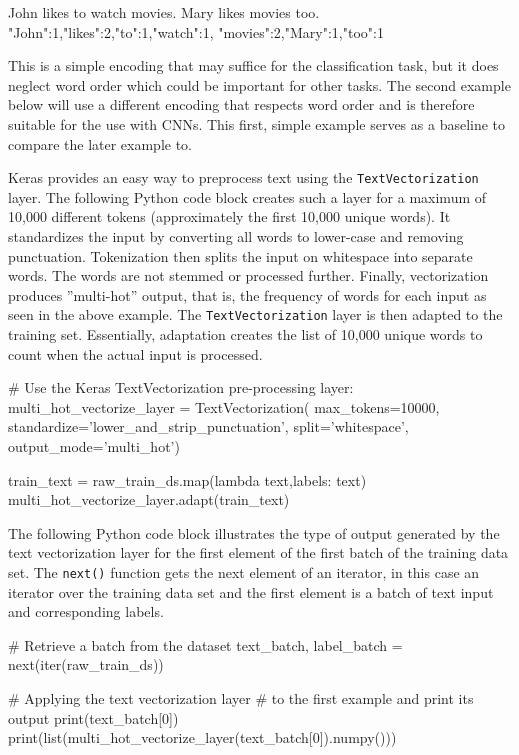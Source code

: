 \begin{textcode}
John likes to watch movies. Mary likes movies too.
{"John":1,"likes":2,"to":1,"watch":1, "movies":2,"Mary":1,"too":1}
\end{textcode}

This is a simple encoding that may suffice for the classification task, but it does neglect word order which could be important for other tasks. The second example below will use a different encoding that respects word order and is therefore suitable for the use with CNNs. This first, simple example serves as a baseline to compare the later example to.

Keras provides an easy way to preprocess text using the \texttt{TextVectorization} layer. The following Python code block creates such a layer for a maximum of 10,000 different tokens (approximately the first 10,000 unique words). It standardizes the input by converting all words to lower-case and removing punctuation. Tokenization then splits the input on whitespace into separate words. The words are not stemmed or processed further. Finally, vectorization produces ''multi-hot'' output, that is, the frequency of words for each input as seen in the above example. The \texttt{TextVectorization} layer is then adapted to the training set. Essentially, adaptation creates the list of 10,000 unique words to count when the actual input is processed.

\begin{pythoncode}
# Use the Keras TextVectorization pre-processing layer:
multi_hot_vectorize_layer = TextVectorization(
    max_tokens=10000,
    standardize='lower_and_strip_punctuation',
    split='whitespace',
    output_mode='multi_hot')
    
train_text = raw_train_ds.map(lambda text,labels: text)
multi_hot_vectorize_layer.adapt(train_text)
\end{pythoncode}

The following Python code block illustrates the type of output generated by the text vectorization layer for the first element of the first batch of the training data set. The \texttt{next()} function gets the next element of an iterator, in this case an iterator over the training data set and the first element is a batch of text input and corresponding labels.

\begin{pythoncode}
# Retrieve a batch from the dataset
text_batch, label_batch = next(iter(raw_train_ds))

# Applying the text vectorization layer
# to the first example and print its output
print(text_batch[0])
print(list(multi_hot_vectorize_layer(text_batch[0]).numpy()))
\end{pythoncode}

